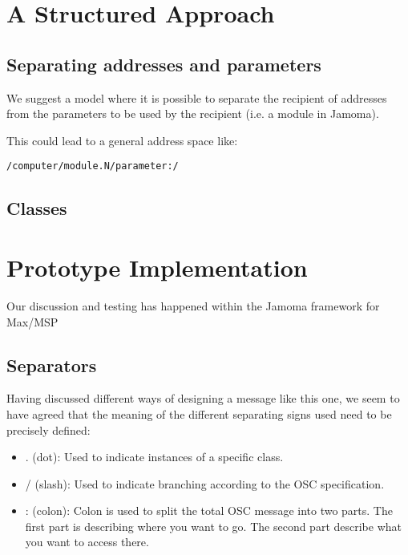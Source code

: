 \documentclass{sig-alternate}
\begin{document}
\section{A Structured Approach}


\subsection{Separating addresses and parameters}

We suggest a model where it is possible to separate the recipient of addresses from the parameters to be used by the recipient (i.e. a module in Jamoma). 

This could lead to a general address space like: 

\begin{small}
\begin{verbatim}
/computer/module.N/parameter:/
\end{verbatim}
\end{small}



\subsection{Classes}




\section{Prototype Implementation}

Our discussion and testing has happened within the Jamoma framework for Max/MSP

\subsection{Separators}


Having discussed different ways of designing a message like this one, we seem to have agreed that the meaning of the different separating signs used need to be precisely defined:

\begin{itemize}

	\item. (dot): Used to indicate instances of a specific class.
	\item / (slash): Used to indicate branching according to the OSC specification.
	\item : (colon): Colon is used to split the total OSC message into two parts. The first part is describing where you want to go. The second part describe what you want to access there.
\end{itemize}
\end{document}
